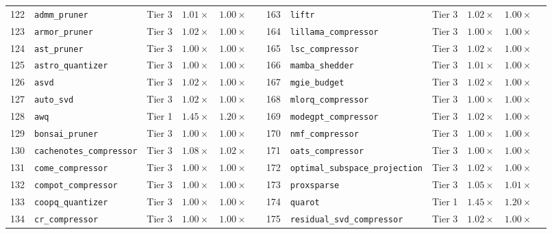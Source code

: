 \begin{table}[t]
{\begin{tabular}{r l c c c l | r l c c c l}
122 & \texttt{admm\_pruner} & Tier 3 & $1.01\times$ & $1.00\times$ & \passslow{} & 163 & \texttt{liftr} & Tier 3 & $1.02\times$ & $1.00\times$ & \passslow{} \\
123 & \texttt{armor\_pruner} & Tier 3 & $1.02\times$ & $1.00\times$ & \passslow{} & 164 & \texttt{lillama\_compressor} & Tier 3 & $1.00\times$ & $1.00\times$ & \passslow{} \\
124 & \texttt{ast\_pruner} & Tier 3 & $1.00\times$ & $1.00\times$ & \passslow{} & 165 & \texttt{lsc\_compressor} & Tier 3 & $1.02\times$ & $1.00\times$ & \passslow{} \\
125 & \texttt{astro\_quantizer} & Tier 3 & $1.00\times$ & $1.00\times$ & \passslow{} & 166 & \texttt{mamba\_shedder} & Tier 3 & $1.01\times$ & $1.00\times$ & \passslow{} \\
126 & \texttt{asvd} & Tier 3 & $1.02\times$ & $1.00\times$ & \passslow{} & 167 & \texttt{mgie\_budget} & Tier 3 & $1.02\times$ & $1.00\times$ & \passslow{} \\
127 & \texttt{auto\_svd} & Tier 3 & $1.02\times$ & $1.00\times$ & \passslow{} & 168 & \texttt{mlorq\_compressor} & Tier 3 & $1.00\times$ & $1.00\times$ & \passslow{} \\
128 & \texttt{awq} & Tier 1 & $1.45\times$ & $1.20\times$ & \passfast{} & 169 & \texttt{modegpt\_compressor} & Tier 3 & $1.02\times$ & $1.00\times$ & \passslow{} \\
129 & \texttt{bonsai\_pruner} & Tier 3 & $1.00\times$ & $1.00\times$ & \passslow{} & 170 & \texttt{nmf\_compressor} & Tier 3 & $1.00\times$ & $1.00\times$ & \passslow{} \\
130 & \texttt{cachenotes\_compressor} & Tier 3 & $1.08\times$ & $1.02\times$ & \passfast{} & 171 & \texttt{oats\_compressor} & Tier 3 & $1.00\times$ & $1.00\times$ & \passslow{} \\
131 & \texttt{come\_compressor} & Tier 3 & $1.00\times$ & $1.00\times$ & \passslow{} & 172 & \texttt{optimal\_subspace\_projection} & Tier 3 & $1.02\times$ & $1.00\times$ & \passslow{} \\
132 & \texttt{compot\_compressor} & Tier 3 & $1.00\times$ & $1.00\times$ & \passslow{} & 173 & \texttt{proxsparse} & Tier 3 & $1.05\times$ & $1.01\times$ & \passfast{} \\
133 & \texttt{coopq\_quantizer} & Tier 3 & $1.00\times$ & $1.00\times$ & \passslow{} & 174 & \texttt{quarot} & Tier 1 & $1.45\times$ & $1.20\times$ & \passfast{} \\
134 & \texttt{cr\_compressor} & Tier 3 & $1.00\times$ & $1.00\times$ & \passslow{} & 175 & \texttt{residual\_svd\_compressor} & Tier 3 & $1.02\times$ & $1.00\times$ & \passslow{} \\

\end{tabular}}
\end{table}

